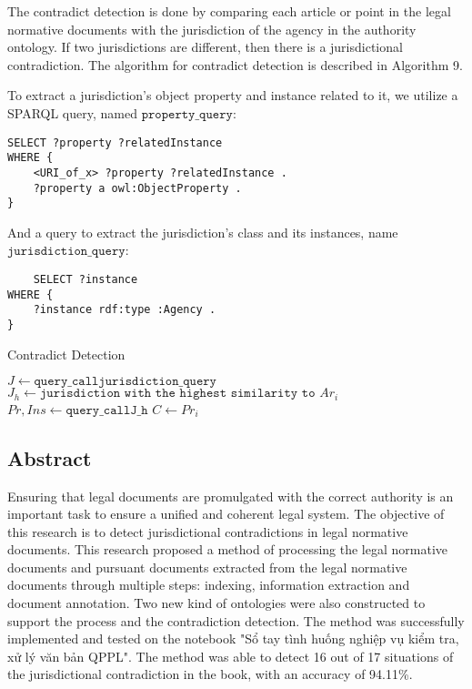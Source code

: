 \begin{algorithm}
The contradict detection is done by comparing each article or point in the legal normative documents with the jurisdiction of the agency in the authority ontology. If two jurisdictions are different, then there is a jurisdictional contradiction. The algorithm for contradict detection is described in Algorithm 9.

To extract a jurisdiction's object property and instance related to it, we utilize a SPARQL query, named $\texttt{property\_query}$:

\begin{lstlisting}
SELECT ?property ?relatedInstance
WHERE {
    <URI_of_x> ?property ?relatedInstance .
    ?property a owl:ObjectProperty .
}
\end{lstlisting}

And a query to extract the jurisdiction's class and its instances, name $\texttt{jurisdiction_query}$:
\begin{lstlisting}
    SELECT ?instance
WHERE {
    ?instance rdf:type :Agency .
}
\end{lstlisting}


\begin{algorithm}[H]
    \caption{Contradict Detection}
    {
        $J \gets \texttt{query_call{jurisdiction_query}}$\;
        {
            $J_h \gets \texttt{jurisdiction with the highest similarity to $Ar_i$}$\;
        }
        $Pr, Ins \gets \texttt{query_call{J_h}}$\;
        {
            {
                $C \gets Pr_i$\;
            }
        } 
    }
\end{algorithm}

\subsection{Abstract}

Ensuring that legal documents are promulgated with the correct authority is an important task to ensure a unified and coherent legal system. The objective of this research is to detect jurisdictional contradictions in legal normative documents. This research proposed a method of processing the legal normative documents and pursuant documents extracted from the legal normative documents through multiple steps: indexing, information extraction and document annotation. Two new kind of ontologies were also constructed to support the process and the contradiction detection. The method was successfully implemented and tested on the notebook "Sổ tay tình huống nghiệp vụ kiểm tra, xử lý văn bản QPPL". The method was able to detect 16 out of 17 situations of the jurisdictional contradiction in the book, with an accuracy of 94.11\%.


\end{algorithm}
